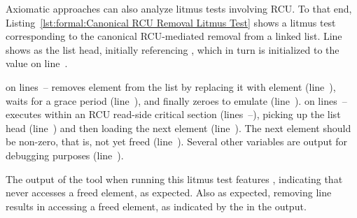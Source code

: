 \begin{lineref}
Axiomatic approaches can also analyze litmus tests involving RCU.
To that end,
Listing~\ref{lst:formal:Canonical RCU Removal Litmus Test}
shows a litmus test corresponding to the canonical RCU-mediated
removal from a linked list.
Line~ shows  as the list head, initially
referencing , which in turn is initialized to the value
 on line~.

 on lines~--
removes element  from the list by replacing it with element 
(line~),
waits for a grace period (line~),
and finally zeroes  to emulate  (line~).
 on lines~--
executes within an RCU read-side critical section
(lines~--),
picking up the list head (line~) and then
loading the next element (line~).
The next element should be non-zero, that is, not yet freed
(line~).
Several other variables are output for debugging purposes
(line~).

The output of the  tool when running this litmus test features
, indicating that  never accesses a freed element,
as expected.
Also as expected, removing line~ results in 
accessing a freed element, as indicated by the  in
the  output.
\end{lineref}

